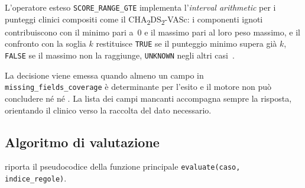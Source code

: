L'operatore esteso \texttt{SCORE\_RANGE\_GTE} implementa l'\emph{interval
arithmetic} per i punteggi clinici compositi come il CHA\textsubscript{2}DS\textsubscript{2}-VASc: i
componenti ignoti contribuiscono con il minimo pari a~0 e il massimo pari al
loro peso massimo, e il confronto con la soglia $k$ restituisce \texttt{TRUE}
se il punteggio minimo supera già $k$, \texttt{FALSE} se il massimo non la
raggiunge, \texttt{UNKNOWN} negli altri casi~\cite{deStefano2014cha2ds2}.

La decisione  viene emessa quando almeno un
campo in \texttt{missing\_fields\_coverage} è determinante per l'esito e il
motore non può concludere né  né
. La lista dei campi mancanti accompagna sempre
la risposta, orientando il clinico verso la raccolta del dato necessario.

\subsection{Algoritmo di valutazione}

 riporta il pseudocodice della funzione principale
\texttt{evaluate(caso, indice\_regole)}.

